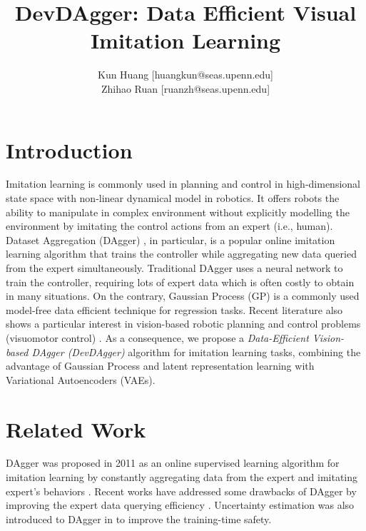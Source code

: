 \documentclass[11pt, reqno, letterpaper, twoside]{amsart}
\title{DevDAgger: Data Efficient Visual Imitation Learning}
\author{
Kun Huang [huangkun@seas.upenn.edu]\\
Zhihao Ruan [ruanzh@seas.upenn.edu] \\
}
\begin{document}

\begin{abstract}
\end{abstract}

\maketitle


\section{Introduction}
Imitation learning is commonly used in planning and control in high-dimensional state space with non-linear dynamical model in robotics. It offers robots the ability to manipulate in complex environment without explicitly modelling the environment by imitating the control actions from an expert (i.e., human). Dataset Aggregation (DAgger) \cite{dagger}, in particular, is a popular online imitation learning algorithm that trains the controller while aggregating new data queried from the expert simultaneously. Traditional DAgger uses a neural network to train the controller, requiring lots of expert data which is often costly to obtain in many situations. On the contrary, Gaussian Process (GP) is a commonly used model-free data efficient technique for regression tasks. Recent literature also shows a particular interest in vision-based robotic planning and control problems (visuomotor control) \cite{vision-based-RL,ebert2018visual,xie2018few}. As a consequence, we propose a \emph{Data-Efficient Vision-based DAgger (DevDAgger)} algorithm for imitation learning tasks, combining the advantage of Gaussian Process and latent representation learning with Variational Autoencoders (VAEs).


\section{Related Work}
DAgger was proposed in 2011 as an online supervised learning algorithm for imitation learning by constantly aggregating data from the expert and imitating expert's behaviors \cite{dagger}. Recent works have addressed some drawbacks of DAgger by improving the expert data querying efficiency \cite{safe-dagger}. Uncertainty estimation was also introduced to DAgger in \cite{ensemble-dagger} to improve the training-time safety.
\end{document}

